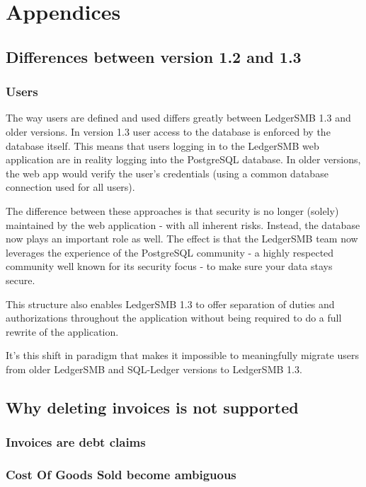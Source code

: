 


\part{Appendices}
\appendix

\chapter{Differences between version 1.2 and 1.3}

\section{Users}
\label{sec:DifferencesUsers}

The way users are defined and used differs greatly between LedgerSMB 1.3 and
older versions. In version 1.3 user access to the database is enforced by the
database itself. This means that users logging in to the LedgerSMB web application
are in reality logging into the PostgreSQL database. In older versions, the web
app would verify the user's credentials (using a common database connection used
for all users).

The difference between these approaches is that security is no longer (solely)
maintained by the web application - with all inherent risks. Instead, the database
now plays an important role as well. The effect is that the LedgerSMB team now
leverages the experience of the PostgreSQL community - a highly respected community
well known for its security focus - to make sure your data stays secure.

This structure also enables LedgerSMB 1.3 to offer separation of duties and
authorizations throughout the application without being required to do a full
rewrite of the application.

It's this shift in paradigm that makes it impossible to meaningfully migrate
users from older LedgerSMB and SQL-Ledger versions to LedgerSMB 1.3.


\chapter{Why deleting invoices is not supported}


\section{Invoices are debt claims}

\section{Cost Of Goods Sold become ambiguous}

